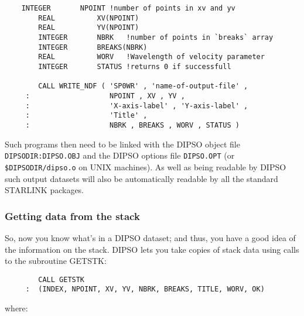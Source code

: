 \begin{small}
\begin{verbatim}
	INTEGER       NPOINT !number of points in xv and yv
        REAL          XV(NPOINT)
        REAL          YV(NPOINT)
        INTEGER       NBRK   !number of points in `breaks` array
        INTEGER       BREAKS(NBRK)
        REAL          WORV   !Wavelength of velocity parameter
        INTEGER       STATUS !returns 0 if successfull
	
        CALL WRITE_NDF ( 'SP0WR' , 'name-of-output-file' , 
     :                   NPOINT , XV , YV , 
     :                   'X-axis-label' , 'Y-axis-label' , 
     :                   'Title' , 
     :                   NBRK , BREAKS , WORV , STATUS )

\end{verbatim}
\end{small}

Such programs then need to be linked with the DIPSO object file  {\tt
DIPSODIR:DIPSO.OBJ} and the DIPSO options file {\tt DIPSO.OPT} (or
{\tt \$DIPSODIR/dipso.o} on UNIX machines). As well as being readable
by DIPSO such output datasets will also be automatically readable by
all the standard STARLINK packages.

\subsubsection {Getting data from the stack}

So, now you know what's in a DIPSO dataset;  and thus, you have a good
idea of the information on the stack. DIPSO lets you take copies of
stack data using calls to the subroutine GETSTK:

\begin{verbatim}
        CALL GETSTK
     :  (INDEX, NPOINT, XV, YV, NBRK, BREAKS, TITLE, WORV, OK)
\end{verbatim}

where:

